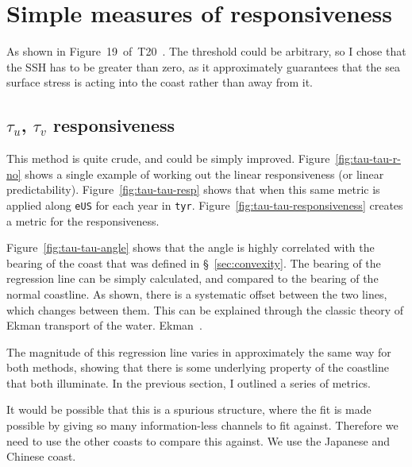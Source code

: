 \section{Simple measures of responsiveness}
\label{sec:3_ORCA12_REG.tex}


As shown in Figure~19~of~T20~\cite{ZannaPreprint}.
The threshold could be arbitrary,
so I chose that the SSH has to be greater than zero,
as it approximately guarantees that the sea surface stress is acting into
the coast rather than away from it.


\subsection{$\tau_u$, $\tau_v$ responsiveness}
\label{sec:tau-tau}
This method is quite crude, and could be simply improved.
Figure~\ref{fig:tau-tau-r-no} shows a single example of working out the linear
responsiveness (or linear predictability).
Figure~\ref{fig:tau-tau-resp} shows that when this same metric is applied along \texttt{eUS}
for each year in \texttt{tyr}. Figure~\ref{fig:tau-tau-responsiveness} creates a metric for the
responsiveness.




\label{sec:angle}

Figure~\ref{fig:tau-tau-angle} shows that the angle is highly correlated with
the bearing of the coast that was defined in §~\ref{sec:convexity}.
The bearing of the regression line can be simply calculated,
and compared to the bearing of the normal coastline.
As shown, there is a systematic offset between the two lines,
which changes between them. This can be explained through the
classic theory of Ekman transport of the water.
Ekman~\cite{hope2013hindcast}.


\label{sec:reg-metrics}

The magnitude of this regression line varies in approximately the same
way for both methods, showing that there is some underlying property of the
coastline that both illuminate. In the previous section, I outlined
a series of metrics.

\label{sec:generalisability}

It would be possible that this is a spurious structure, where the fit
is made possible by giving so many information-less channels to fit against.
Therefore we need to use the other coasts to compare this against.
We use the Japanese and Chinese coast.





\FloatBarrier

